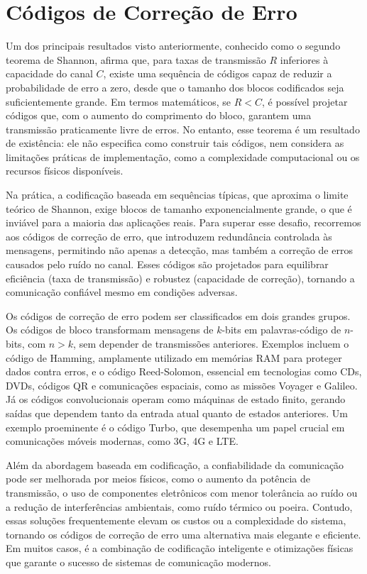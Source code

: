 \chapter{Códigos de Correção de Erro}

Um dos principais resultados visto anteriormente, conhecido como o segundo teorema de
Shannon, afirma que, para taxas de transmissão $R$ inferiores à capacidade
do canal $C$, existe uma sequência de códigos capaz de reduzir a
probabilidade de erro a zero, desde que o tamanho dos blocos codificados seja
suficientemente grande. Em termos matemáticos, se $R < C$, é possível
projetar códigos que, com o aumento do comprimento do bloco, garantem uma
transmissão praticamente livre de erros. No entanto, esse teorema é um
resultado de existência: ele não especifica como construir tais códigos, nem
considera as limitações práticas de implementação, como a complexidade
computacional ou os recursos físicos disponíveis.

Na prática, a codificação baseada em sequências típicas, que aproxima o limite
teórico de Shannon, exige blocos de tamanho exponencialmente grande, o que é
inviável para a maioria das aplicações reais. Para superar esse desafio,
recorremos aos códigos de correção de erro, que introduzem redundância
controlada às mensagens, permitindo não apenas a detecção, mas também a
correção de erros causados pelo ruído no canal. Esses códigos são projetados
para equilibrar eficiência (taxa de transmissão) e robustez (capacidade de
correção), tornando a comunicação confiável mesmo em condições adversas.

Os códigos de correção de erro podem ser classificados em dois grandes grupos.
Os códigos de bloco transformam mensagens de $k$-bits em
palavras-código de $n$-bits, com $n > k$, sem depender de transmissões
anteriores. Exemplos incluem o código de Hamming, amplamente utilizado em
memórias RAM para proteger dados contra erros, e o código Reed-Solomon,
essencial em tecnologias como CDs, DVDs, códigos QR e comunicações espaciais,
como as missões Voyager e Galileo. Já os códigos convolucionais operam
como máquinas de estado finito, gerando saídas que dependem tanto da entrada
atual quanto de estados anteriores. Um exemplo proeminente é o código Turbo,
que desempenha um papel crucial em comunicações móveis modernas, como 3G, 4G e
LTE.

Além da abordagem baseada em codificação, a confiabilidade da comunicação pode
ser melhorada por meios físicos, como o aumento da potência de transmissão, o
uso de componentes eletrônicos com menor tolerância ao ruído ou a redução de
interferências ambientais, como ruído térmico ou poeira. Contudo, essas
soluções frequentemente elevam os custos ou a complexidade do sistema, tornando
os códigos de correção de erro uma alternativa mais elegante e eficiente. Em
muitos casos, é a combinação de codificação inteligente e otimizações físicas
que garante o sucesso de sistemas de comunicação modernos.






